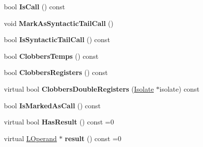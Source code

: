 \begin{DoxyCompactItemize}
\item 
bool {\bfseries Is\+Call} () const \hypertarget{classv8_1_1internal_1_1_l_instruction_a00e004b64fc7724c83aad55ac9530e0f}{}\label{classv8_1_1internal_1_1_l_instruction_a00e004b64fc7724c83aad55ac9530e0f}

\item 
void {\bfseries Mark\+As\+Syntactic\+Tail\+Call} ()\hypertarget{classv8_1_1internal_1_1_l_instruction_a72c62906028bed230decd2719d08a847}{}\label{classv8_1_1internal_1_1_l_instruction_a72c62906028bed230decd2719d08a847}

\item 
bool {\bfseries Is\+Syntactic\+Tail\+Call} () const \hypertarget{classv8_1_1internal_1_1_l_instruction_a2f5419706e2dbe5ab9cc774e3c2816c0}{}\label{classv8_1_1internal_1_1_l_instruction_a2f5419706e2dbe5ab9cc774e3c2816c0}

\item 
bool {\bfseries Clobbers\+Temps} () const \hypertarget{classv8_1_1internal_1_1_l_instruction_ae0d7f1fe3d3d67357050ddb2cd539d62}{}\label{classv8_1_1internal_1_1_l_instruction_ae0d7f1fe3d3d67357050ddb2cd539d62}

\item 
bool {\bfseries Clobbers\+Registers} () const \hypertarget{classv8_1_1internal_1_1_l_instruction_a1be40eb2a9feb7da6047a05f41e6fb5c}{}\label{classv8_1_1internal_1_1_l_instruction_a1be40eb2a9feb7da6047a05f41e6fb5c}

\item 
virtual bool {\bfseries Clobbers\+Double\+Registers} (\hyperlink{classv8_1_1internal_1_1_isolate}{Isolate} $\ast$isolate) const \hypertarget{classv8_1_1internal_1_1_l_instruction_acbdd958e836acbc67e53ae3de2b17149}{}\label{classv8_1_1internal_1_1_l_instruction_acbdd958e836acbc67e53ae3de2b17149}

\item 
bool {\bfseries Is\+Marked\+As\+Call} () const \hypertarget{classv8_1_1internal_1_1_l_instruction_afb5aff9204835a6dcec75538e3da4b2f}{}\label{classv8_1_1internal_1_1_l_instruction_afb5aff9204835a6dcec75538e3da4b2f}

\item 
virtual bool {\bfseries Has\+Result} () const  =0\hypertarget{classv8_1_1internal_1_1_l_instruction_af38ca7b40171f2ed75a2970ac7e15fd8}{}\label{classv8_1_1internal_1_1_l_instruction_af38ca7b40171f2ed75a2970ac7e15fd8}

\item 
virtual \hyperlink{classv8_1_1internal_1_1_l_operand}{L\+Operand} $\ast$ {\bfseries result} () const  =0\hypertarget{classv8_1_1internal_1_1_l_instruction_a3c5b856bb92c72dabcf08086abf6f8d7}{}\label{classv8_1_1internal_1_1_l_instruction_a3c5b856bb92c72dabcf08086abf6f8d7}


\end{DoxyCompactItemize}
